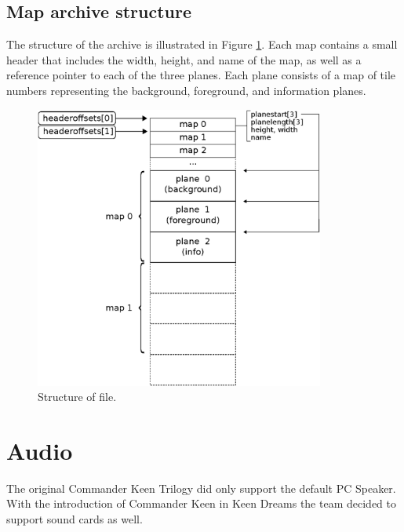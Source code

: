 \documentclass[book.tex]{subfiles}
\begin{document}
\pagebreak
 
\subsection{Map archive structure}
The structure of the  archive is illustrated in Figure \ref{fig:map-file}. Each map contains a small header that includes the width, height, and name of the map, as well as a reference pointer to each of the three planes. Each plane consists of a map of tile numbers representing the background, foreground, and information planes.\\

\par
\begin{minipage}{\textwidth}
 \par
 \end{minipage}
 
\par
\begin{figure}[H]
\centering 
 \includegraphics[width=0.85\textwidth]{imgs/drawings/kdreams_map.eps}
 \caption{Structure of  file.}
 \label{fig:map-file}
\end{figure}

\section{Audio}
\label{section:audio}
The original Commander Keen Trilogy did only support the default PC Speaker. With the introduction of Commander Keen in Keen Dreams the team decided to support sound cards as well.\\
\end{document}
